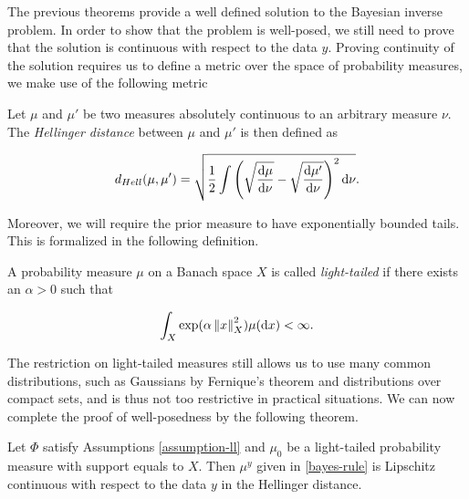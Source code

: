 The previous theorems provide a well defined solution to the Bayesian inverse problem. In order to show that the problem is well-posed, we still need to prove that the solution is continuous with respect to the data $y$. Proving continuity of the solution requires us to define a metric over the space of probability measures, we make use of the following metric

\begin{definition} Let $\mu$ and $\mu'$ be two measures absolutely continuous to an arbitrary measure $\nu$. The \textit{Hellinger distance} between $\mu$ and $\mu'$ is then defined as

  \begin{equation*}
    d_{Hell}(\mu, \mu') = \sqrt{\frac12\int\left(\sqrt{\frac{\text{d} \mu}{\text{d} \nu}} - \sqrt{\frac{\text{d} \mu'}{\text{d} \nu}}\right)^2\text{d} \nu}.
  \end{equation*}
\end{definition}

Moreover, we will require the prior measure to have exponentially bounded tails. This is formalized in the following definition.

\begin{definition}
  A probability measure $\mu$ on a Banach space $X$ is called \textit{light-tailed} if there exists an $\alpha > 0$ such that

  \begin{equation*}
    \int_X\exp(\alpha\left\lVert x\right\rVert^2_X)\mu(\text{d} x) < \infty.
  \end{equation*}
\end{definition}

The restriction on light-tailed measures still allows us to use many common distributions, such as Gaussians by Fernique's theorem and distributions over compact sets, and is thus not too restrictive in practical situations. We can now complete the proof of well-posedness by the following theorem.

\begin{theorem}
  Let $\Phi$ satisfy Assumptions \ref{assumption-ll} and $\mu_0$ be a light-tailed probability measure with support equals to $X$. Then $\mu^y$ given in \ref{bayes-rule} is Lipschitz continuous with respect to the data $y$ in the Hellinger distance.
\end{theorem}

